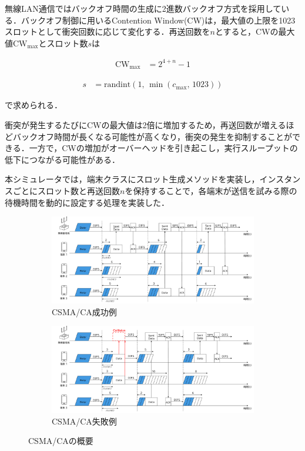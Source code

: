 \documentclass[a4paper,10.5pt]{ltjsarticle}
\begin{document}
無線LAN通信ではバックオフ時間の生成に2進数バックオフ方式を採用している．バックオフ制御に用いるContention Window(CW)は，最大値の上限を1023スロットとして衝突回数に応じて変化する．再送回数を$n$とすると，CWの最大値$\mathrm{CW}_{\max}$とスロット数$s$は


\begin{align}
  \mathrm{CW}_{\max} &= 2^{4 + n} - 1
\end{align}

\begin{align}
  s &= \mathrm{randint}(1, \, \min(c_{\max}, \, 1023))
  \label{slot}
\end{align}

で求められる．

衝突が発生するたびにCWの最大値は2倍に増加するため，再送回数が増えるほどバックオフ時間が長くなる可能性が高くなり，衝突の発生を抑制することができる．一方で，CWの増加がオーバーヘッドを引き起こし，実行スループットの低下につながる可能性がある．


本シミュレータでは，端末クラスにスロット生成メソッドを実装し，インスタンスごとにスロット数と再送回数$n$を保持することで，各端末が送信を試みる際の待機時間を動的に設定する処理を実装した．

\begin{figure}[htbp]
  \centering

  \begin{subfigure}{0.8}
    \centering
    \includegraphics[width=1\columnwidth]{./assets/csma-ca-s.png}
    \caption{CSMA/CA成功例}
    \label{1a}
  \end{subfigure}


  \begin{subfigure}{0.8}
    \centering
    \includegraphics[width=1\columnwidth]{./assets/csma-ca-f.png}
    \caption{CSMA/CA失敗例}
    \label{1b}
  \end{subfigure}


  \caption{CSMA/CAの概要}
  \label{CSMA/CA}
\end{figure}
\end{document}
